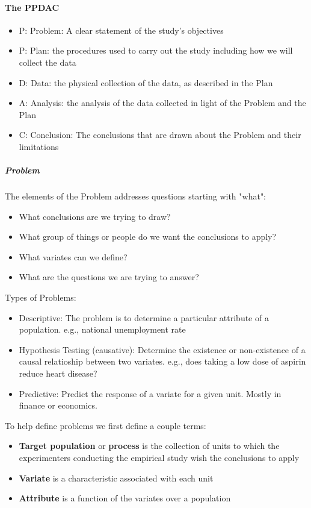\documentclass[10pt,letter]{article}
\theoremstyle{plain}
\theoremstyle{definition}
\begin{document}
\paragraph{The PPDAC}
\begin{itemize}
    \item P: Problem: A clear statement of the study's objectives
    \item P: Plan: the procedures used to carry out the study including how we will collect the data
    \item D: Data: the physical collection of the data, as described in the Plan
    \item A: Analysis: the analysis of the data collected in light of the Problem and the Plan 
    \item C: Conclusion: The conclusions that are drawn about the Problem and their limitations
\end{itemize}

\subparagraph{Problem}
The elements of the Problem addresses questions starting with "what": 
\begin{itemize}
    \item What conclusions are we trying to draw? 
    \item What group of things or people do we want the conclusions to apply? 
    \item What variates can we define? 
    \item What are the questions we are trying to answer?
\end{itemize}

Types of Problems:
\begin{itemize}
    \item Descriptive: The problem is to determine a particular attribute of a population. e.g., national unemployment rate
    \item Hypothesis Testing (causative): Determine the existence or non-existence of a causal relatioship between two variates. e.g., does taking a low dose of aspirin reduce heart disease?
    \item Predictive: Predict the response of a variate for a given unit. Mostly in finance or economics. 
\end{itemize}
To help define problems we first define a couple terms: 
\begin{itemize}
    \item \textbf{Target population} or \textbf{process} is the collection of units to which the experimenters conducting the empirical study wish the conclusions to apply 
    \item \textbf{Variate} is a characteristic associated with each unit 
    \item \textbf{Attribute} is a function of the variates over a population
\end{itemize}
\end{document}
